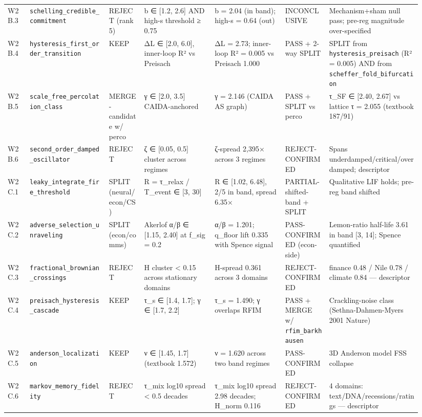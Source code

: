 \documentclass[
  11pt]{article}
\begin{document}
{\begin{longtable}[]{@{}p{0.05\linewidth}p{0.18\linewidth}p{0.08\linewidth}p{0.16\linewidth}p{0.16\linewidth}p{0.10\linewidth}p{0.21\linewidth}@{}}
W2B.3 & \texttt{schelling\_credible\_commitment} & REJECT (rank 5) & b ∈ [1.2, 2.6] AND high-s threshold ≥ 0.75 & b = 2.04 (in band); high-s = 0.64 (out) & INCONCLUSIVE & Mechanism+sham null pass; pre-reg magnitude over-specified \\
W2B.4 & \texttt{hysteresis\_first\_order\_transition} & KEEP & ΔL ∈ [2.0, 6.0], inner-loop R² vs Preisach & ΔL = 2.73; inner-loop R² = 0.005 vs Preisach 1.000 & PASS + 2-way SPLIT & SPLIT from \texttt{hysteresis\_preisach} (R² = 0.005) AND from \texttt{scheffer\_fold\_bifurcation} \\
W2B.5 & \texttt{scale\_free\_percolation\_class} & MERGE-candidate w/ perco & γ ∈ [2.0, 3.5] CAIDA-anchored & γ = 2.146 (CAIDA AS graph) & PASS + SPLIT vs perco & τ\_SF ∈ [2.40, 2.67] vs lattice τ = 2.055 (textbook 187/91) \\
W2B.6 & \texttt{second\_order\_damped\_oscillator} & REJECT & ζ ∈ [0.05, 0.5] cluster across regimes & ζ-spread 2{,}395× across 3 regimes & REJECT-CONFIRMED & Spans underdamped/critical/overdamped; descriptor \\
W2C.1 & \texttt{leaky\_integrate\_fire\_threshold} & SPLIT (neural/econ/CS) & R = τ\_relax / T\_event ∈ [3, 30] & R ∈ [1.02, 6.48], 2/5 in band, spread 6.35× & PARTIAL-shifted-band + SPLIT & Qualitative LIF holds; pre-reg band shifted \\
W2C.2 & \texttt{adverse\_selection\_unraveling} & SPLIT (econ/comms) & Akerlof α/β ∈ [1.15, 2.40] at f\_sig = 0.2 & α/β = 1.201; q\_floor lift 0.335 with Spence signal & PASS-CONFIRMED (econ-side) & Lemon-ratio half-life 3.61 in band [3, 14]; Spence quantified \\
W2C.3 & \texttt{fractional\_brownian\_crossings} & REJECT & H cluster < 0.15 across stationary domains & H-spread 0.361 across 3 domains & REJECT-CONFIRMED & finance 0.48 / Nile 0.78 / climate 0.84 --- descriptor \\
W2C.4 & \texttt{preisach\_hysteresis\_cascade} & KEEP & τ\_s ∈ [1.4, 1.7]; γ ∈ [1.7, 2.2] & τ\_s = 1.490; γ overlaps RFIM & PASS + MERGE w/ \texttt{rfim\_barkhausen} & Crackling-noise class (Sethna-Dahmen-Myers 2001 Nature) \\
W2C.5 & \texttt{anderson\_localization} & KEEP & ν ∈ [1.45, 1.7] (textbook 1.572) & ν = 1.620 across two band regimes & PASS-CONFIRMED & 3D Anderson model FSS collapse \\
W2C.6 & \texttt{markov\_memory\_fidelity} & REJECT & τ\_mix log10 spread < 0.5 decades & τ\_mix log10 spread 2.98 decades; H\_norm 0.116 & REJECT-CONFIRMED & 4 domains: text/DNA/recessions/ratings --- descriptor \\
\end{longtable}
}
\end{document}
